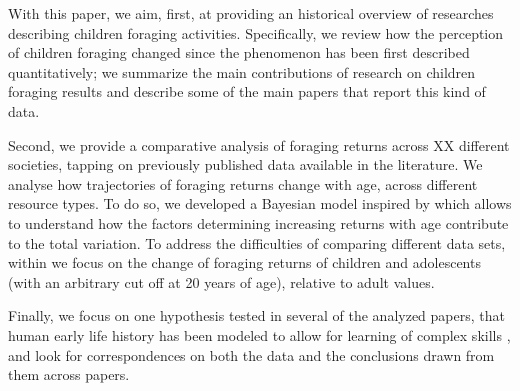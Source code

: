 

\vspace{0.5cm}
With this paper, we aim, first, at providing an historical overview of researches describing children foraging activities. 
Specifically, we review how the perception of children foraging changed since the phenomenon has been first described quantitatively; we summarize the main contributions of research on children foraging results and describe some of the main papers that report this kind of data.

Second, we provide a comparative analysis of foraging returns across XX different societies, tapping on previously published data available in the literature. 
We analyse how trajectories of foraging returns change with age, across different resource types. To do so, we developed a Bayesian model inspired by \cite{koster_life_2020} which allows to understand how the factors determining increasing returns with age contribute to the total variation. 
To address the difficulties of comparing different data sets, within we focus on the change of foraging returns of children and adolescents (with an arbitrary cut off at 20 years of age), relative to adult values.

Finally, we focus on one hypothesis tested in several of the analyzed papers, that human early life history has been modeled to allow for learning of complex skills \cite{kaplan_theory_2000}, and look for correspondences on both the data and the conclusions drawn from them across papers.  








